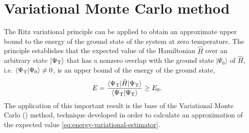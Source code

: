 %
%


\section{Variational Monte Carlo method}

The Ritz variational principle can be applied to obtain an approximate upper
bound to the energy of the ground state of the system at zero temperature. The
principle establishes that the expected value of the Hamiltonian $\hat H$ over
an arbitrary state $\vert \Psi_{\mathrm{T}} \rangle$ that has a nonzero overlap with the
ground state $\vert \Psi_0 \rangle$ of $\hat H$, i.e. $\langle \Psi_{\mathrm{T}} \vert
  \Psi_0 \rangle \neq 0$, is an upper bound of the energy of the ground state,
%
\begin{equation}
  \label{eq:energy-variational-estimator}
  E = \frac{\langle \Psi_{\mathrm{T}} \vert {\hat{H}} \vert \Psi_{\mathrm{T}} \rangle}{\langle \Psi_{\mathrm{T}} \vert \Psi_{\mathrm{T}}\rangle} \geq E_0.
\end{equation}
%
The application of this important result is the base of the Variational Monte
Carlo (\VMC) method, technique developed in order to calculate an approximation
of the expected value \eqref{eq:energy-variational-estimator}.

